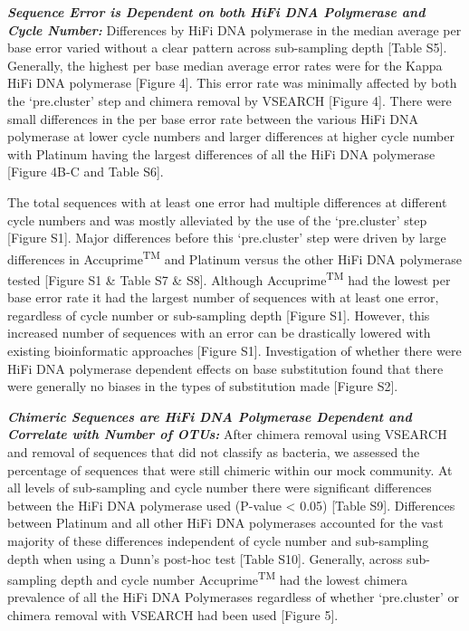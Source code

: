 \documentclass[12pt,]{article}
\begin{document}
\textbf{\emph{Sequence Error is Dependent on both HiFi DNA Polymerase
and Cycle Number:}} Differences by HiFi DNA polymerase in the median
average per base error varied without a clear pattern across
sub-sampling depth {[}Table S5{]}. Generally, the highest per base
median average error rates were for the Kappa HiFi DNA polymerase
{[}Figure 4{]}. This error rate was minimally affected by both the
`pre.cluster' step and chimera removal by VSEARCH {[}Figure 4{]}. There
were small differences in the per base error rate between the various
HiFi DNA polymerase at lower cycle numbers and larger differences at
higher cycle number with Platinum having the largest differences of all
the HiFi DNA polymerase {[}Figure 4B-C and Table S6{]}.

The total sequences with at least one error had multiple differences at
different cycle numbers and was mostly alleviated by the use of the
`pre.cluster' step {[}Figure S1{]}. Major differences before this
`pre.cluster' step were driven by large differences in
Accuprime\textsuperscript{TM} and Platinum versus the other HiFi DNA
polymerase tested {[}Figure S1 \& Table S7 \& S8{]}. Although
Accuprime\textsuperscript{TM} had the lowest per base error rate it had
the largest number of sequences with at least one error, regardless of
cycle number or sub-sampling depth {[}Figure S1{]}. However, this
increased number of sequences with an error can be drastically lowered
with existing bioinformatic approaches {[}Figure S1{]}. Investigation of
whether there were HiFi DNA polymerase dependent effects on base
substitution found that there were generally no biases in the types of
substitution made {[}Figure S2{]}.

\textbf{\emph{Chimeric Sequences are HiFi DNA Polymerase Dependent and
Correlate with Number of OTUs:}} After chimera removal using VSEARCH and
removal of sequences that did not classify as bacteria, we assessed the
percentage of sequences that were still chimeric within our mock
community. At all levels of sub-sampling and cycle number there were
significant differences between the HiFi DNA polymerase used (P-value
\textless{} 0.05) {[}Table S9{]}. Differences between Platinum and all
other HiFi DNA polymerases accounted for the vast majority of these
differences independent of cycle number and sub-sampling depth when
using a Dunn's post-hoc test {[}Table S10{]}. Generally, across
sub-sampling depth and cycle number Accuprime\textsuperscript{TM} had
the lowest chimera prevalence of all the HiFi DNA Polymerases regardless
of whether `pre.cluster' or chimera removal with VSEARCH had been used
{[}Figure 5{]}.
\end{document}
